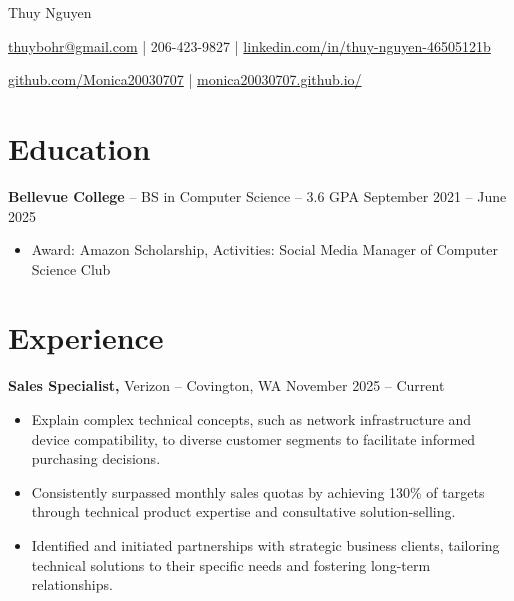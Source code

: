 \documentclass[11pt]{article}       %
\begin{document}
\centerline{\Huge Thuy Nguyen}

\vspace{5pt}

\centerline{\href{mailto:thuybohr@gmail.com}{thuybohr@gmail.com} | 206-423-9827 |
\href{https://www.linkedin.com/in/thuy-nguyen-46505121b/}{linkedin.com/in/thuy-nguyen-46505121b}}

\centerline{\href{https://github.com/Monica20030707}{github.com/Monica20030707} | 
\href{https://monica20030707.github.io/}{monica20030707.github.io/}} 

\vspace{-9pt}

\section*{Education}
	\textbf{Bellevue College} -- BS in Computer Science -- 3.6 GPA \hfill September 2021 -- June 2025
\vspace{-9pt}
\begin{itemize}
  \item Award: Amazon Scholarship, Activities: Social Media Manager of Computer Science Club
\end{itemize}

\vspace{-18.5pt}

\section*{Experience}
	\textbf{Sales Specialist,} {Verizon} -- Covington, WA \hfill November 2025 -- Current 
\vspace{-9pt}
\begin{itemize}
  \item Explain complex technical concepts, such as network infrastructure and device compatibility, to diverse customer segments to facilitate informed purchasing decisions.
  \item Consistently surpassed monthly sales quotas by achieving 130\% of targets through technical product expertise and consultative solution-selling.
  \item Identified and initiated partnerships with strategic business clients, tailoring technical solutions to their specific needs and fostering long-term relationships.
\end{itemize}
\end{document}
